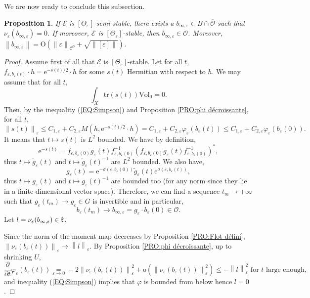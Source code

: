 \documentclass{article}
\newtheorem{proposition}[theorem]{Proposition}
\theoremstyle{remark}
\theoremstyle{definition}
\newcommand{\landau}[2]{\underset{#1 \rightarrow #2}{=}}
\newcommand{\tr}{\mathrm{tr}}
\newcommand{\Vol}{\mathrm{Vol}}
\newcommand{\e}{\boldsymbol{\mathrm{e}}}
\newcommand{\norme}[1]{\left\| #1 \right\|}
\newcommand{\E}{\mathcal{E}}
\newcommand{\mC}{\mathcal{C}}
\renewcommand{\leq}{\leqslant}
\begin{document}
We are now ready to conclude this subsection.
\begin{proposition}\label{PRO:Limite b_varepsilon}
    If $\E$ is $[\Theta_\varepsilon]$-semi-stable, there exists a $b_{\infty,\varepsilon} \in B \cap \overline{\mathcal{O}}$ such that $\nu_\varepsilon(b_{\infty,\varepsilon}) = 0$. If moreover, $\E$ is $[\Theta_\varepsilon]$-stable, then $b_{\infty,\varepsilon} \in \mathcal{O}$. Moreover, $\norme{b_{\infty,\varepsilon}} = \mathrm{O}\!\left(\norme{\varepsilon}_{\mC^0} + \sqrt{\norme{[\varepsilon]}}\right)$.
\end{proposition}
\begin{proof}
Assume first of all that $\E$ is $[\Theta_\varepsilon]$-stable. Let for all $t$, $f_{\varepsilon,b_\varepsilon(t)} \cdot h = \e^{-s(t)/2} \cdot h$ for some $s(t)$ Hermitian with respect to $h$. We may assume that for all $t$,
$$
\int_X \tr(s(t))\Vol_0 = 0.
$$
Then, by the inequality (\ref{EQ:Simpson}) and Proposition \ref{PRO:phi décroissante}, for all $t$,
$$
\norme{s(t)}_\varepsilon \leq C_{1,\varepsilon} + C_{2,\varepsilon}M(h,\e^{-s(t)/2} \cdot h) = C_{1,\varepsilon} + C_{2,\varepsilon}\varphi_\varepsilon(b_\varepsilon(t)) \leq C_{1,\varepsilon} + C_{2,\varepsilon}\varphi_\varepsilon(b_\varepsilon(0)).
$$
It means that $t \mapsto s(t)$ is $L^2$ bounded. We have by definition,
$$
\e^{-s(t)} = f_{\varepsilon,b_\varepsilon(0)}\tilde{g}_\varepsilon(t)f_{\varepsilon,b_\varepsilon(0)}^{-1}(f_{\varepsilon,b_\varepsilon(0)}\tilde{g}_\varepsilon(t)f_{\varepsilon,b_\varepsilon(0)}^{-1})^*,
$$
thus $t \mapsto \tilde{g}_\varepsilon(t)$ and $t \mapsto \tilde{g}_\varepsilon(t)^{-1}$ are $L^2$ bounded. We also have,
$$
g_\varepsilon(t) = \e^{-\sigma(\varepsilon,b_\varepsilon(0))}\tilde{g}_\varepsilon(t)\e^{\sigma(\varepsilon,b_\varepsilon(t))},
$$
thus $t \mapsto g_\varepsilon(t)$ and $t \mapsto g_\varepsilon(t)^{-1}$ are bounded too (for any norm since they lie in a finite dimensional vector space). Therefore, we can find a sequence $t_m \rightarrow +\infty$ such that $g_\varepsilon(t_m) \rightarrow g_\varepsilon \in G$ is invertible and in particular,
$$
b_\varepsilon(t_m) \rightarrow b_{\infty,\varepsilon} = g_\varepsilon \cdot b_\varepsilon(0) \in \mathcal{O}.
$$
Let $l = \nu_\varepsilon(b_{\infty,\varepsilon}) \in \frak{k}$.

Since the norm of the moment map decreases by Proposition \ref{PRO:Flot défini}, $\norme{\nu_\varepsilon(b_\varepsilon(t))}_\varepsilon \rightarrow \norme{l}_\varepsilon$. By Proposition \ref{PRO:phi décroissante}, up to shrinking $U$,
$$
\frac{\partial}{\partial t}\varphi_\varepsilon(b_\varepsilon(t)) \landau{\varepsilon}{0} -2\norme{\nu_\varepsilon(b_\varepsilon(t))}_\varepsilon^2 + \mathrm{o}(\norme{\nu_\varepsilon(b_\varepsilon(t))}_\varepsilon^2) \leq -\norme{l}_\varepsilon^2 \textrm{ for $t$ large enough},
$$
and inequality (\ref{EQ:Simpson}) implies that $\varphi$ is bounded from below hence $l = 0$.


\end{proof}
\end{document}
